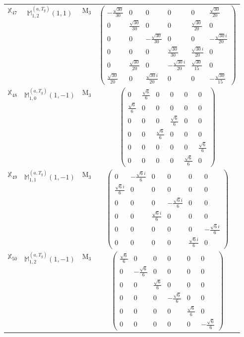 \documentclass[fleqn,10pt,landscape]{article}
\begin{document}
\begin{itemize}
\begin{center}
\begin{longtable}{c|c|c|c}
$ \mathbb{X}_{47} $ & $\mathbb{M}_{1,2}^{(a,T_{g})}(1,1)$ & M$_{3}$ & $\begin{pmatrix} - \frac{\sqrt{30}}{30} & 0 & 0 & 0 & 0 & \frac{\sqrt{30}}{20} \\ 0 & \frac{\sqrt{30}}{30} & 0 & 0 & \frac{\sqrt{30}}{20} & 0 \\ 0 & 0 & - \frac{\sqrt{30}}{30} & 0 & 0 & - \frac{\sqrt{30} i}{20} \\ 0 & 0 & 0 & \frac{\sqrt{30}}{30} & \frac{\sqrt{30} i}{20} & 0 \\ 0 & \frac{\sqrt{30}}{20} & 0 & - \frac{\sqrt{30} i}{20} & \frac{\sqrt{30}}{15} & 0 \\ \frac{\sqrt{30}}{20} & 0 & \frac{\sqrt{30} i}{20} & 0 & 0 & - \frac{\sqrt{30}}{15} \end{pmatrix}$ \\
$ \mathbb{X}_{48} $ & $\mathbb{M}_{1,0}^{(a,T_{g})}(1,-1)$ & M$_{3}$ & $\begin{pmatrix} 0 & \frac{\sqrt{6}}{6} & 0 & 0 & 0 & 0 \\ \frac{\sqrt{6}}{6} & 0 & 0 & 0 & 0 & 0 \\ 0 & 0 & 0 & \frac{\sqrt{6}}{6} & 0 & 0 \\ 0 & 0 & \frac{\sqrt{6}}{6} & 0 & 0 & 0 \\ 0 & 0 & 0 & 0 & 0 & \frac{\sqrt{6}}{6} \\ 0 & 0 & 0 & 0 & \frac{\sqrt{6}}{6} & 0 \end{pmatrix}$ \\
$ \mathbb{X}_{49} $ & $\mathbb{M}_{1,1}^{(a,T_{g})}(1,-1)$ & M$_{3}$ & $\begin{pmatrix} 0 & - \frac{\sqrt{6} i}{6} & 0 & 0 & 0 & 0 \\ \frac{\sqrt{6} i}{6} & 0 & 0 & 0 & 0 & 0 \\ 0 & 0 & 0 & - \frac{\sqrt{6} i}{6} & 0 & 0 \\ 0 & 0 & \frac{\sqrt{6} i}{6} & 0 & 0 & 0 \\ 0 & 0 & 0 & 0 & 0 & - \frac{\sqrt{6} i}{6} \\ 0 & 0 & 0 & 0 & \frac{\sqrt{6} i}{6} & 0 \end{pmatrix}$ \\
$ \mathbb{X}_{50} $ & $\mathbb{M}_{1,2}^{(a,T_{g})}(1,-1)$ & M$_{3}$ & $\begin{pmatrix} \frac{\sqrt{6}}{6} & 0 & 0 & 0 & 0 & 0 \\ 0 & - \frac{\sqrt{6}}{6} & 0 & 0 & 0 & 0 \\ 0 & 0 & \frac{\sqrt{6}}{6} & 0 & 0 & 0 \\ 0 & 0 & 0 & - \frac{\sqrt{6}}{6} & 0 & 0 \\ 0 & 0 & 0 & 0 & \frac{\sqrt{6}}{6} & 0 \\ 0 & 0 & 0 & 0 & 0 & - \frac{\sqrt{6}}{6} \end{pmatrix}$ \\

\end{longtable}
\end{center}
\end{itemize}
\end{document}

